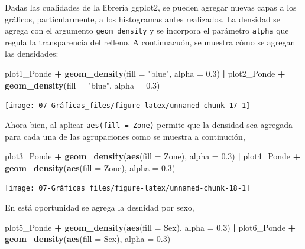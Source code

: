 \documentclass[
  spanish,
  12pt,
]{book}
\newenvironment{Shaded}{\begin{snugshade}}{\end{snugshade}}
\newcommand{\AttributeTok}[1]{\textcolor[rgb]{0.13,0.29,0.53}{#1}}
\newcommand{\FloatTok}[1]{\textcolor[rgb]{0.00,0.00,0.81}{#1}}
\newcommand{\FunctionTok}[1]{\textcolor[rgb]{0.13,0.29,0.53}{\textbf{#1}}}
\newcommand{\NormalTok}[1]{#1}
\newcommand{\SpecialCharTok}[1]{\textcolor[rgb]{0.81,0.36,0.00}{\textbf{#1}}}
\newcommand{\StringTok}[1]{\textcolor[rgb]{0.31,0.60,0.02}{#1}}
\begin{document}
Dadas las cualidades de la librería ggplot2, se pueden agregar nuevas capas a los gráficos, particularmente, a los histogramas antes realizados. La densidad se agrega con el argumento \texttt{geom\_density} y se incorpora el parámetro \texttt{alpha} que regula la transparencia del relleno. A continuacuón, se muestra cómo se agregan las densidades:

\begin{Shaded}
\begin{Highlighting}[]
\NormalTok{plot1\_Ponde }\SpecialCharTok{+} \FunctionTok{geom\_density}\NormalTok{(}\AttributeTok{fill =} \StringTok{"blue"}\NormalTok{, }\AttributeTok{alpha =} \FloatTok{0.3}\NormalTok{) }\SpecialCharTok{|}
\NormalTok{  plot2\_Ponde }\SpecialCharTok{+} \FunctionTok{geom\_density}\NormalTok{(}\AttributeTok{fill =} \StringTok{"blue"}\NormalTok{, }\AttributeTok{alpha =} \FloatTok{0.3}\NormalTok{)}
\end{Highlighting}
\end{Shaded}

\begin{center}\texttt{[image: 07-Gráficas\_files/figure-latex/unnamed-chunk-17-1]} \end{center}

Ahora bien, al aplicar \texttt{aes(fill\ =\ Zone)} permite que la densidad sea agregada para cada una de las agrupaciones como se muestra a continución,

\begin{Shaded}
\begin{Highlighting}[]
\NormalTok{plot3\_Ponde }\SpecialCharTok{+} \FunctionTok{geom\_density}\NormalTok{(}\FunctionTok{aes}\NormalTok{(}\AttributeTok{fill =}\NormalTok{ Zone), }\AttributeTok{alpha =} \FloatTok{0.3}\NormalTok{) }\SpecialCharTok{|}
\NormalTok{  plot4\_Ponde }\SpecialCharTok{+} \FunctionTok{geom\_density}\NormalTok{(}\FunctionTok{aes}\NormalTok{(}\AttributeTok{fill =}\NormalTok{ Zone), }\AttributeTok{alpha =} \FloatTok{0.3}\NormalTok{)}
\end{Highlighting}
\end{Shaded}

\begin{center}\texttt{[image: 07-Gráficas\_files/figure-latex/unnamed-chunk-18-1]} \end{center}

En está oportunidad se agrega la desnidad por sexo,

\begin{Shaded}
\begin{Highlighting}[]
\NormalTok{plot5\_Ponde }\SpecialCharTok{+} \FunctionTok{geom\_density}\NormalTok{(}\FunctionTok{aes}\NormalTok{(}\AttributeTok{fill =}\NormalTok{ Sex), }\AttributeTok{alpha =} \FloatTok{0.3}\NormalTok{) }\SpecialCharTok{|}
\NormalTok{  plot6\_Ponde }\SpecialCharTok{+} \FunctionTok{geom\_density}\NormalTok{(}\FunctionTok{aes}\NormalTok{(}\AttributeTok{fill =}\NormalTok{ Sex), }\AttributeTok{alpha =} \FloatTok{0.3}\NormalTok{)}
\end{Highlighting}
\end{Shaded}
\end{document}
